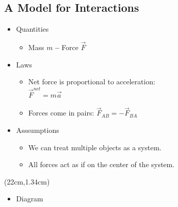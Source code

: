 \documentclass[]{article}
\begin{document}
\newpage
\begin{TeacherMargin}

\end{TeacherMargin}
\begin{PresentSpace}
\vspace{-10pt}
\section*{A Model for Interactions}
\vspace{-10pt}
\begin{itemize}
	\item Quantities
	\begin{itemize}
		\item Mass \quad $m$ \qquad \textbf{--} Force \quad $\vec{F}$
	\end{itemize}
	\item Laws
	\begin{itemize}
		\item Net force is proportional to acceleration: \\
		$\vec{F}^{net}=m\vec{a}$
		\item Forces come in pairs: $\vec{F}_{AB} = -\vec{F}_{BA}$
	\end{itemize}
	\item Asssumptions
	\begin{itemize}
		\item We can treat multiple objects as a system.
		\item All forces act as if on the center of the system.
	\end{itemize}
\end{itemize}
\end{PresentSpace}
\begin{textblock*}{5cm}(22cm,1.34cm)
\Large
\begin{itemize}
	\item Diagram
\end{itemize}
\centering
{}
\end{textblock*}
\end{document}
